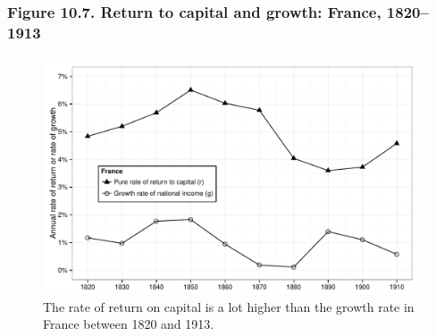 \documentclass[t]{beamer}\usepackage[]{graphicx}\usepackage[]{color}
\newenvironment{knitrout}{}{} %
\begin{document}
\begin{frame}[label=Figure_10_7]
\frametitle{Figure 10.7. Return to capital and growth: France, 1820--1913}
\begin{figure}[t]
\begin{minipage}[b]{\textwidth}
\centering
\begin{knitrout}\footnotesize
{}\color{fgcolor}

{\centering \includegraphics[width=1\linewidth]{figures/bw/Figure_10_7} 

}



\end{knitrout}
\caption{The rate of return on capital is a lot higher than the growth rate in France between 1820 and 1913.}
\end{minipage}
\end{figure}
\end{frame}
\end{document}
